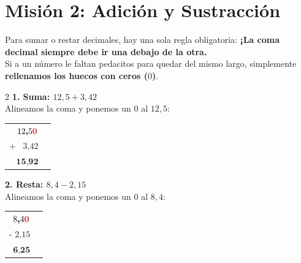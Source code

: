 \documentclass[12pt, letterpaper]{article}
\begin{document}
	\newpage
	
	\section*{Misión 2: Adición y Sustracción}
	
	\begin{concepto}{}
		Para sumar o restar decimales, hay una sola regla obligatoria: \textbf{¡La coma decimal siempre debe ir una debajo de la otra.}
		\\
		Si a un número le faltan pedacitos para quedar del mismo largo, simplemente \textbf{rellenamos los huecos con ceros ($0$)}.
	\end{concepto}
	
	\vspace{0.2cm}
	\noindent\begin{minipage}{\textwidth}
		\begin{ejemplo}
			\begin{multicols}{2}
				\textbf{1. Suma: $12,5 + 3,42$}\\
				Alineamos la coma y ponemos un $0$ al $12,5$:
				\begin{center}
					\begin{tabular}{r@{\quad}l}
						$1 2 \textbf{,} 5 \textcolor{valred}{\mathbf{0}}$ & \\
						+ $\phantom{0} 3 \textbf{,} 4 2$ & \\
						\hline
						$\mathbf{1 5 \textbf{,} 9 2}$ & 
					\end{tabular}
				\end{center}
				
				\columnbreak
				
				\textbf{2. Resta: $8,4 - 2,15$}\\
				Alineamos la coma y ponemos un $0$ al $8,4$:
				\begin{center}
					\begin{tabular}{r@{\quad}l}
						$8 \textbf{,} 4 \textcolor{valred}{\mathbf{0}}$ & \\
						- $2 \textbf{,} 1 5$ & \\
						\hline
						$\mathbf{6 \textbf{,} 2 5}$ & 
					\end{tabular}
				\end{center}
			\end{multicols}
		\end{ejemplo}
	\end{minipage}
	
\end{document}
